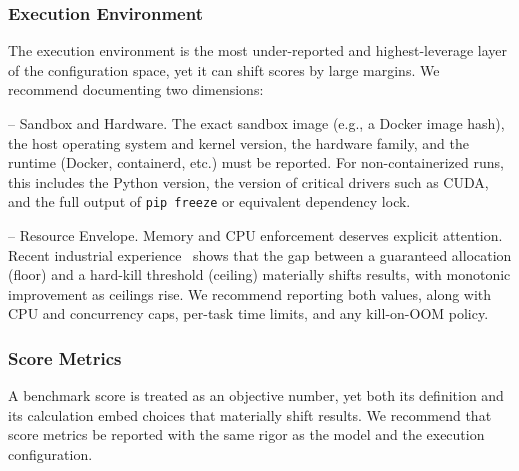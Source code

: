 \documentclass{IEEEcsmag}
\begin{document}

\subsubsection{Execution Environment}
The execution environment is the most under-reported and highest-leverage layer of the configuration space, yet it can shift scores by large margins. We recommend documenting two dimensions:

\smallskip \noindent -- Sandbox and Hardware. The exact sandbox image (e.g., a Docker image hash), the host operating system and kernel version, the hardware family, and the runtime (Docker, containerd, etc.) must be reported. For non-containerized runs, this includes the Python version, the version of critical drivers such as CUDA, and the full output of \texttt{pip freeze} or equivalent dependency lock.

\smallskip \noindent -- Resource Envelope. Memory and CPU enforcement deserves explicit attention. Recent industrial experience~\cite{anthropic2026noise} shows that the gap between a guaranteed allocation (floor) and a hard-kill threshold (ceiling) materially shifts results, with monotonic improvement as ceilings rise. We recommend reporting both values, along with CPU and concurrency caps, per-task time limits, and any kill-on-OOM policy.

\subsubsection{Score Metrics}
A benchmark score is treated as an objective number, yet both its definition and its calculation embed choices that materially shift results. We recommend that score metrics be reported with the same rigor as the model and the execution configuration.
\end{document}
